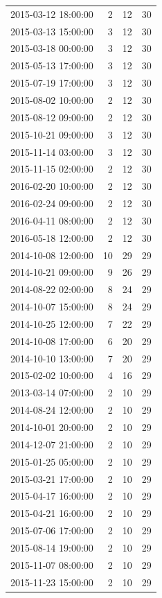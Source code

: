 \begin{tabular}{lrrr}
2015-03-12 18:00:00 & 2 & 12 & 30 \\
2015-03-13 15:00:00 & 3 & 12 & 30 \\
2015-03-18 00:00:00 & 3 & 12 & 30 \\
2015-05-13 17:00:00 & 3 & 12 & 30 \\
2015-07-19 17:00:00 & 3 & 12 & 30 \\
2015-08-02 10:00:00 & 2 & 12 & 30 \\
2015-08-12 09:00:00 & 2 & 12 & 30 \\
2015-10-21 09:00:00 & 3 & 12 & 30 \\
2015-11-14 03:00:00 & 3 & 12 & 30 \\
2015-11-15 02:00:00 & 2 & 12 & 30 \\
2016-02-20 10:00:00 & 2 & 12 & 30 \\
2016-02-24 09:00:00 & 2 & 12 & 30 \\
2016-04-11 08:00:00 & 2 & 12 & 30 \\
2016-05-18 12:00:00 & 2 & 12 & 30 \\
2014-10-08 12:00:00 & 10 & 29 & 29 \\
2014-10-21 09:00:00 & 9 & 26 & 29 \\
2014-08-22 02:00:00 & 8 & 24 & 29 \\
2014-10-07 15:00:00 & 8 & 24 & 29 \\
2014-10-25 12:00:00 & 7 & 22 & 29 \\
2014-10-08 17:00:00 & 6 & 20 & 29 \\
2014-10-10 13:00:00 & 7 & 20 & 29 \\
2015-02-02 10:00:00 & 4 & 16 & 29 \\
2013-03-14 07:00:00 & 2 & 10 & 29 \\
2014-08-24 12:00:00 & 2 & 10 & 29 \\
2014-10-01 20:00:00 & 2 & 10 & 29 \\
2014-12-07 21:00:00 & 2 & 10 & 29 \\
2015-01-25 05:00:00 & 2 & 10 & 29 \\
2015-03-21 17:00:00 & 2 & 10 & 29 \\
2015-04-17 16:00:00 & 2 & 10 & 29 \\
2015-04-21 16:00:00 & 2 & 10 & 29 \\
2015-07-06 17:00:00 & 2 & 10 & 29 \\
2015-08-14 19:00:00 & 2 & 10 & 29 \\
2015-11-07 08:00:00 & 2 & 10 & 29 \\
2015-11-23 15:00:00 & 2 & 10 & 29 \\

\end{tabular}
